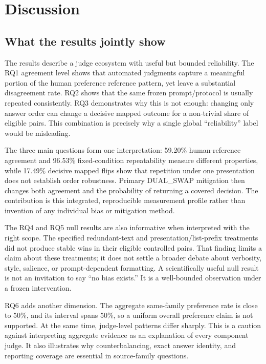 \chapter{Discussion}
\label{ch:discussion}

\section{What the results jointly show}

The results describe a judge ecosystem with useful but bounded reliability. The RQ1 agreement level shows that automated judgments capture a meaningful portion of the human preference reference pattern, yet leave a substantial disagreement rate. RQ2 shows that the same frozen prompt/protocol is usually repeated consistently. RQ3 demonstrates why this is not enough: changing only answer order can change a decisive mapped outcome for a non-trivial share of eligible pairs. This combination is precisely why a single global ``reliability'' label would be misleading.

The three main questions form one interpretation: 59.20\% human-reference agreement and 96.53\% fixed-condition repeatability measure different properties, while 17.49\% decisive mapped flips show that repetition under one presentation does not establish order robustness. Primary DUAL\_SWAP mitigation then changes both agreement and the probability of returning a covered decision. The contribution is this integrated, reproducible measurement profile rather than invention of any individual bias or mitigation method.

The RQ4 and RQ5 null results are also informative when interpreted with the right scope. The specified redundant-text and presentation/list-prefix treatments did not produce stable wins in their eligible controlled pairs. That finding limits a claim about these treatments; it does not settle a broader debate about verbosity, style, salience, or prompt-dependent formatting. A scientifically useful null result is not an invitation to say ``no bias exists.'' It is a well-bounded observation under a frozen intervention.

RQ6 adds another dimension. The aggregate same-family preference rate is close to 50\%, and its interval spans 50\%, so a uniform overall preference claim is not supported. At the same time, judge-level patterns differ sharply. This is a caution against interpreting aggregate evidence as an explanation of every component judge. It also illustrates why counterbalancing, exact answer identity, and reporting coverage are essential in source-family questions.

